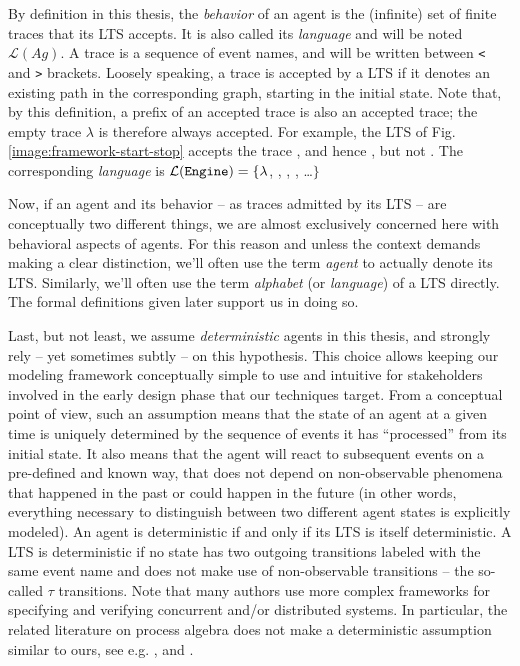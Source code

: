 By definition in this thesis, the \emph{behavior} of an agent is the (infinite) set of finite traces that its LTS accepts. It is also called its \emph{language} and will be noted $\mathcal{L}(Ag)$. A trace is a sequence of event names, and will be written between \verb|<| and \verb|>| brackets. Loosely speaking, a trace is accepted by a LTS if it denotes an existing path in the corresponding graph, starting in the initial state. Note that, by this definition, a prefix of an accepted trace is also an accepted trace; the empty trace $\lambda$ is therefore always accepted. For example, the LTS of Fig.\ref{image:framework-start-stop} accepts the trace , and hence , but not . The corresponding \emph{language} is $\mathcal{L}(\texttt{Engine})=\{\lambda$, , , , \ldots $\}$

Now, if an agent and its behavior -- as traces admitted by its LTS -- are conceptually two different things, we are almost exclusively concerned here with behavioral aspects of agents. For this reason and unless the context demands making a clear distinction, we'll often use the term \emph{agent} to actually denote its LTS. Similarly, we'll often use the term \emph{alphabet} (or \emph{language}) of a LTS directly. The formal definitions given later support us in doing so.

Last, but not least, we assume \emph{deterministic} agents in this thesis, and strongly rely -- yet sometimes subtly -- on this hypothesis. This choice allows keeping our modeling framework conceptually simple to use and intuitive for stakeholders involved in the early design phase that our techniques target. From a conceptual point of view, such an assumption means that the state of an agent at a given time is uniquely determined by the sequence of events it has ``processed'' from its initial state. It also means that the agent will react to subsequent events on a pre-defined and known way, that does not depend on non-observable phenomena that happened in the past or could happen in the future (in other words, everything necessary to distinguish between two different agent states is explicitly modeled). An agent is deterministic if and only if its LTS is itself deterministic. A LTS is deterministic if no state has two outgoing transitions labeled with the same event name and does not make use of non-observable transitions -- the so-called $\tau$ transitions. Note that many authors use more complex frameworks for specifying and verifying concurrent and/or distributed systems. In particular, the related literature on process algebra does not make a deterministic assumption similar to ours, see e.g. \cite{Hoare:1985}, \cite{Milner:1989} and \cite{Magee:1999}.

